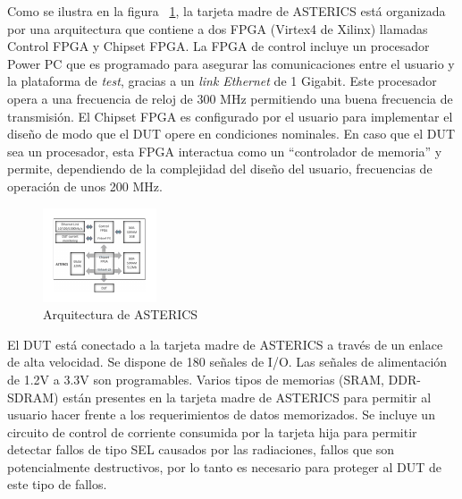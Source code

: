 \documentclass[a4paper,openright,12pt]{report}
\begin{document}
Como se ilustra en la figura ~\ref{ASTERICS2}, la tarjeta madre de ASTERICS está organizada por una arquitectura que contiene a dos FPGA (Virtex4 de Xilinx) llamadas Control FPGA y Chipset FPGA. La FPGA de control incluye un procesador Power PC que es programado para asegurar las comunicaciones entre el usuario y la plataforma de \textit{test}, gracias a un \textit{link Ethernet} de 1 Gigabit. Este procesador opera a una frecuencia de reloj de 300 MHz permitiendo una buena frecuencia de transmisión. El Chipset FPGA es configurado por el usuario para implementar el diseño de modo que el DUT opere en condiciones nominales.  En caso que el DUT sea un procesador, esta FPGA interactua como un ``controlador de memoria'' y permite, dependiendo de la complejidad del diseño del usuario, frecuencias de operación de unos 200 MHz. 

\begin{figure}[H]
	\centering
	\includegraphics[width=0.45 \textwidth]{img/ASTERICS.pdf}
	\caption{Arquitectura de ASTERICS}
	\label{ASTERICS2}
\end{figure}

El DUT está conectado a la tarjeta madre de ASTERICS a través de un enlace de alta velocidad.  Se dispone de 180 señales de I/O. Las señales de alimentación de 1.2V a 3.3V son programables. Varios tipos de memorias (SRAM, DDR-SDRAM) están  presentes en la tarjeta madre de ASTERICS para permitir al usuario hacer frente a los requerimientos de datos memorizados. Se incluye un circuito de control de corriente consumida por la tarjeta hija  para permitir detectar fallos de tipo SEL   causados por las radiaciones, fallos que son potencialmente destructivos, por lo tanto es necesario para proteger al DUT de este tipo de fallos.  
\end{document}
